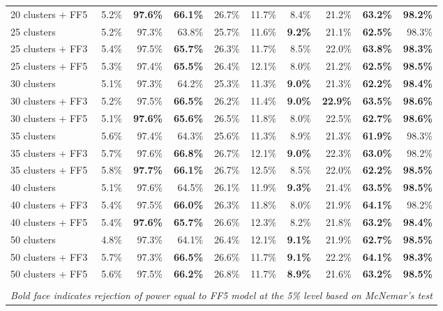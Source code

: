 \begin{table}[!h]
\begin{center}
\begin{tabular}{lrrrrrrrrr}
20 clusters + FF5	& 5.2\% & \textbf{97.6\%} & \textbf{66.1\%} & 26.7\% & 11.7\% & 8.4\% & 21.2\% & \textbf{63.2\%} & \textbf{98.2\%} \\
25 clusters	& 5.2\% & 97.3\% & 63.8\% & 25.7\% & 11.6\% & \textbf{9.2\%} & 21.1\% & \textbf{62.5\%} & 98.3\% \\
25 clusters + FF3	& 5.4\% & 97.5\% & \textbf{65.7\%} & 26.3\% & 11.7\% & 8.5\% & 22.0\% & \textbf{63.8\%} & \textbf{98.3\%} \\
25 clusters + FF5	& 5.3\% & 97.4\% & \textbf{65.5\%} & 26.4\% & 12.1\% & 8.0\% & 21.2\% & \textbf{62.5\%} & \textbf{98.5\%} \\
30 clusters	& 5.1\% & 97.3\% & 64.2\% & 25.3\% & 11.3\% & \textbf{9.0\%} & 21.3\% & \textbf{62.2\%} & \textbf{98.4\%} \\
30 clusters + FF3	& 5.2\% & 97.5\% & \textbf{66.5\%} & 26.2\% & 11.4\% & \textbf{9.0\%} & \textbf{22.9\%} & \textbf{63.5\%} & \textbf{98.6\%} \\
30 clusters + FF5	& 5.1\% & \textbf{97.6\%} & \textbf{65.6\%} & 26.5\% & 11.8\% & 8.0\% & 22.5\% & \textbf{62.7\%} & \textbf{98.6\%} \\
35 clusters	& 5.6\% & 97.4\% & 64.3\% & 25.6\% & 11.3\% & 8.9\% & 21.3\% & \textbf{61.9\%} & 98.3\% \\
35 clusters + FF3	& 5.7\% & 97.6\% & \textbf{66.8\%} & 26.7\% & 12.1\% & \textbf{9.0\%} & 22.3\% & \textbf{63.0\%} & 98.2\% \\
35 clusters + FF5	& 5.8\% & \textbf{97.7\%} & \textbf{66.1\%} & 26.7\% & 12.5\% & 8.5\% & 22.0\% & \textbf{62.2\%} & \textbf{98.5\%} \\
40 clusters	& 5.1\% & 97.6\% & 64.5\% & 26.1\% & 11.9\% & \textbf{9.3\%} & 21.4\% & \textbf{63.5\%} & \textbf{98.5\%} \\
40 clusters + FF3	& 5.4\% & 97.5\% & \textbf{66.0\%} & 26.3\% & 11.8\% & 8.0\% & 21.9\% & \textbf{64.1\%} & 98.2\% \\
40 clusters + FF5	& 5.4\% & \textbf{97.6\%} & \textbf{65.7\%} & 26.6\% & 12.3\% & 8.2\% & 21.8\% & \textbf{63.2\%} & \textbf{98.4\%} \\
50 clusters	& 4.8\% & 97.3\% & 64.1\% & 26.4\% & 12.1\% & \textbf{9.1\%} & 21.9\% & \textbf{62.7\%} & \textbf{98.5\%} \\
50 clusters + FF3	& 5.7\% & 97.3\% & \textbf{66.5\%} & 26.6\% & 11.7\% & \textbf{9.1\%} & 22.2\% & \textbf{64.1\%} & \textbf{98.3\%} \\
50 clusters + FF5	& 5.6\% & 97.5\% & \textbf{66.2\%} & 26.8\% & 11.7\% & \textbf{8.9\%} & 21.6\% & \textbf{63.2\%} & \textbf{98.5\%} \\
\hline\\
\multicolumn{10}{l}{\itshape Bold face indicates rejection of power equal to FF5 model at the 5\% level based on McNemar's test}
    \end{tabular}
    \end{center}
\end{table}
